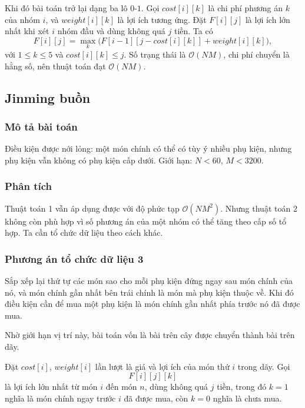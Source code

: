 \documentclass[11pt]{article}
\newcommand{\Oh}{\mathcal{O}}
\begin{document}
Khi đó bài toán trở lại dạng ba lô \(0\)-\(1\). Gọi
\(\mathit{cost}[i][k]\) là chi phí phương án \(k\) của nhóm \(i\), và
\(\mathit{weight}[i][k]\) là lợi ích tương ứng. Đặt \(F[i][j]\) là lợi ích lớn
nhất khi xét \(i\) nhóm đầu và dùng không quá \(j\) tiền. Ta có
\[
  F[i][j]=\max_k\bigl(F[i-1][j-\mathit{cost}[i][k]]
      +\mathit{weight}[i][k]\bigr),
\]
với \(1\le k\le 5\) và \(\mathit{cost}[i][k]\le j\). Số trạng thái là
\(\Oh(NM)\), chi phí chuyển là hằng số, nên thuật toán đạt \(\Oh(NM)\).

\subsection{Jinming buồn}

\subsubsection*{Mô tả bài toán}

Điều kiện được nới lỏng: một món chính có thể có tùy ý nhiều phụ kiện, nhưng
phụ kiện vẫn không có phụ kiện cấp dưới. Giới hạn: \(N<60\), \(M<3200\).

\subsubsection*{Phân tích}

Thuật toán 1 vẫn áp dụng được với độ phức tạp \(\Oh(NM^2)\). Nhưng thuật toán
2 không còn phù hợp vì số phương án của một nhóm có thể tăng theo cấp số tổ
hợp. Ta cần tổ chức dữ liệu theo cách khác.

\subsubsection*{Phương án tổ chức dữ liệu 3}

Sắp xếp lại thứ tự các món sao cho mỗi phụ kiện đứng ngay sau món chính của
nó, và món chính gần nhất bên trái chính là món mà phụ kiện thuộc về. Khi đó
điều kiện cần để mua một phụ kiện là món chính gần nhất phía trước nó đã được
mua.

Nhờ giới hạn vị trí này, bài toán vốn là bài trên cây được chuyển thành bài
trên dãy.

Đặt \(\mathit{cost}[i]\), \(\mathit{weight}[i]\) lần lượt là giá và lợi ích của
món thứ \(i\) trong dãy. Gọi
\[
  F[i][j][k]
\]
là lợi ích lớn nhất từ món \(i\) đến món \(n\), dùng không quá \(j\) tiền,
trong đó \(k=1\) nghĩa là món chính ngay trước \(i\) đã được mua, còn \(k=0\)
nghĩa là chưa mua.
\end{document}
